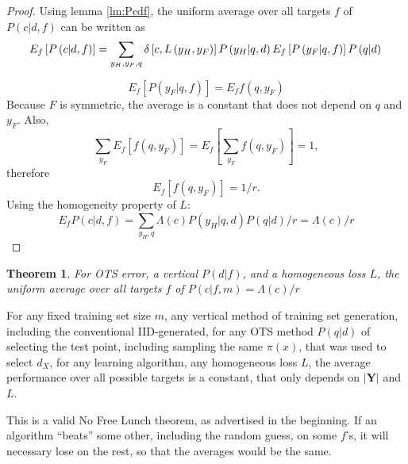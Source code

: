 \documentclass[a4paper]{article}
\newtheorem{theorem}{Theorem}[section]
\begin{document}
\begin{proof}
  Using lemma \ref{lm:Pcdf}, the uniform average over all targets $f$
  of $P\left(c|d,f\right)$ can be written as
  \begin{equation}
    E_f \left[P\left(c|d,f\right)\right] = \sum_{y_H,y_F,q}
      \delta\left[c,L\left(y_H, y_F\right)\right]
      P\left(y_H|q,d\right) E_f \left[P\left(y_F|q,f\right)\right] P\left(q|d\right) \\
  \end{equation}

  \begin{equation}
    E_f \left[P\left(y_F|q,f\right)\right] = E_f f(q,y_F)
  \end{equation}
  Because $F$ is symmetric, the average is a constant that does
  not depend on $q$ and $y_F$. Also,
  \begin{equation}
    \sum_{y_F} E_f\left[f(q, y_F)\right] = E_f\left[\sum_{y_F} f(q, y_F)\right] = 1,  
  \end{equation}
  therefore
  \begin{equation}
    E_f\left[f(q, y_F)\right] = 1/r.
  \end{equation}
  Using the homogeneity property of $L$:
  \begin{equation}
    E_f P\left(c|d,f\right) = \sum_{y_H, q} \Lambda(c)
    P\left(y_H|q,d\right)  P\left(q|d\right) / r = \Lambda(c)/r
  \end{equation}
\end{proof}

\begin{theorem}
  For OTS error, a vertical $P\left(d|f\right)$, and a homogeneous
  loss $L$, the uniform average over all targets $f$ of
  $P\left(c|f, m\right) = \Lambda(c)/r$
  \label{th:Pcfm}
\end{theorem}

For any fixed training set size $m$, any vertical method of
training set generation, including the conventional IID-generated, for
any OTS method $P(q|d)$ of selecting the test point, including
sampling the same $\pi(x)$, that was used to select $d_X$, for any
learning algorithm, any homogeneous loss $L$, the average performance
over all possible targets is a constant, that only depends on
$\left|\mathbf{Y}\right|$ and $L$.

This is a valid No Free Lunch theorem, as advertised in the
beginning. If an algorithm ``beats'' some other, including the random
guess, on some $f$'s, it will necessary lose on the rest, so that the
averages would be the same.
\end{document}
